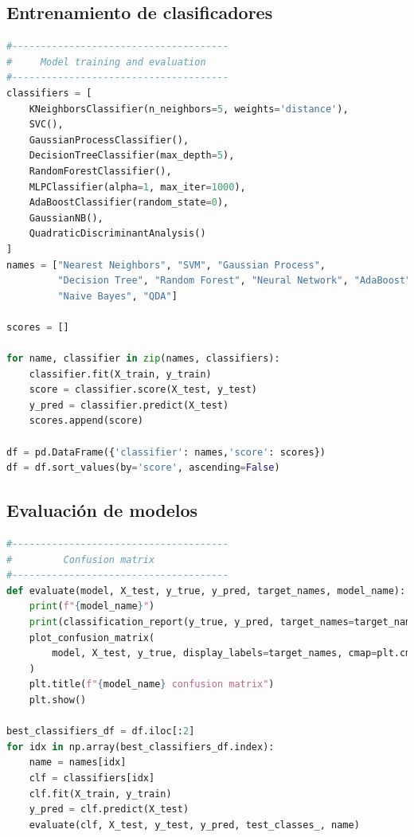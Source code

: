 \documentclass[conference]{IEEEtran}
\begin{document}
\subsection{Entrenamiento de clasificadores}

\begin{lstlisting}[language=python]
#--------------------------------------
#     Model training and evaluation
#--------------------------------------
classifiers = [
    KNeighborsClassifier(n_neighbors=5, weights='distance'),
    SVC(),
    GaussianProcessClassifier(),
    DecisionTreeClassifier(max_depth=5),
    RandomForestClassifier(),
    MLPClassifier(alpha=1, max_iter=1000),
    AdaBoostClassifier(random_state=0),
    GaussianNB(),
    QuadraticDiscriminantAnalysis()
]
names = ["Nearest Neighbors", "SVM", "Gaussian Process",
         "Decision Tree", "Random Forest", "Neural Network", "AdaBoost",
         "Naive Bayes", "QDA"]

scores = []

for name, classifier in zip(names, classifiers):
    classifier.fit(X_train, y_train)
    score = classifier.score(X_test, y_test)
    y_pred = classifier.predict(X_test)
    scores.append(score)

df = pd.DataFrame({'classifier': names,'score': scores})
df = df.sort_values(by='score', ascending=False)\end{lstlisting}

\subsection{Evaluación de modelos}
\begin{lstlisting}[language=python]
#--------------------------------------
#         Confusion matrix
#--------------------------------------
def evaluate(model, X_test, y_true, y_pred, target_names, model_name):
    print(f"{model_name}")
    print(classification_report(y_true, y_pred, target_names=target_names))
    plot_confusion_matrix(
        model, X_test, y_true, display_labels=target_names, cmap=plt.cm.Blues
    )
    plt.title(f"{model_name} confusion matrix")
    plt.show()
    
best_classifiers_df = df.iloc[:2]
for idx in np.array(best_classifiers_df.index):
    name = names[idx]
    clf = classifiers[idx]
    clf.fit(X_train, y_train)
    y_pred = clf.predict(X_test)
    evaluate(clf, X_test, y_test, y_pred, test_classes_, name)\end{lstlisting}
\end{document}
